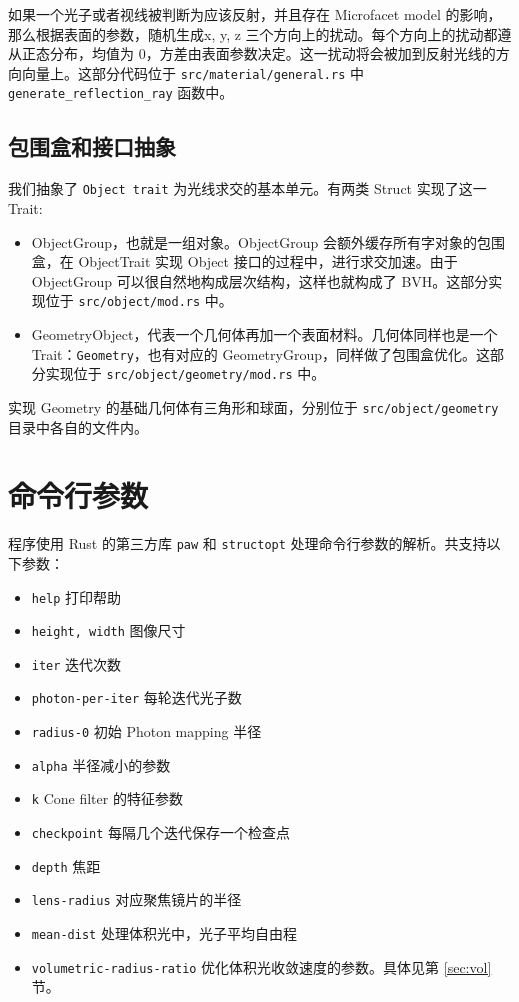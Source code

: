 \documentclass{ctexart}
\begin{document}
如果一个光子或者视线被判断为应该反射，并且存在 Microfacet model 的影响，那么根据表面的参数，随机生成x, y, z 三个方向上的扰动。每个方向上的扰动都遵从正态分布，均值为 0，方差由表面参数决定。这一扰动将会被加到反射光线的方向向量上。这部分代码位于 \texttt{src/material/general.rs} 中 \texttt{generate\_reflection\_ray} 函数中。

\subsection{包围盒和接口抽象}
我们抽象了 \texttt{Object trait} 为光线求交的基本单元。有两类 Struct 实现了这一 Trait:

\begin{itemize}
  \item ObjectGroup，也就是一组对象。ObjectGroup 会额外缓存所有字对象的包围盒，在 ObjectTrait 实现 Object 接口的过程中，进行求交加速。由于 ObjectGroup 可以很自然地构成层次结构，这样也就构成了 BVH。这部分实现位于 \texttt{src/object/mod.rs} 中。
  \item GeometryObject，代表一个几何体再加一个表面材料。几何体同样也是一个 Trait：\texttt{Geometry}，也有对应的 GeometryGroup，同样做了包围盒优化。这部分实现位于 \texttt{src/object/geometry/mod.rs} 中。
\end{itemize}

实现 Geometry 的基础几何体有三角形和球面，分别位于 \texttt{src/object/geometry} 目录中各自的文件内。

\section{命令行参数}
\label{sec:options}
程序使用 Rust 的第三方库 \texttt{paw} 和 \texttt{structopt} 处理命令行参数的解析。共支持以下参数：

\begin{itemize}
  \item \texttt{help} 打印帮助
  \item \texttt{height, width} 图像尺寸
  \item \texttt{iter} 迭代次数
  \item \texttt{photon-per-iter} 每轮迭代光子数
  \item \texttt{radius-0} 初始 Photon mapping 半径
  \item \texttt{alpha} 半径减小的参数
  \item \texttt{k} Cone filter 的特征参数
  \item \texttt{checkpoint} 每隔几个迭代保存一个检查点
  \item \texttt{depth} 焦距
  \item \texttt{lens-radius} 对应聚焦镜片的半径
  \item \texttt{mean-dist} 处理体积光中，光子平均自由程
  \item \texttt{volumetric-radius-ratio} 优化体积光收敛速度的参数。具体见第 \ref{sec:vol} 节。
\end{itemize}
\end{document}
